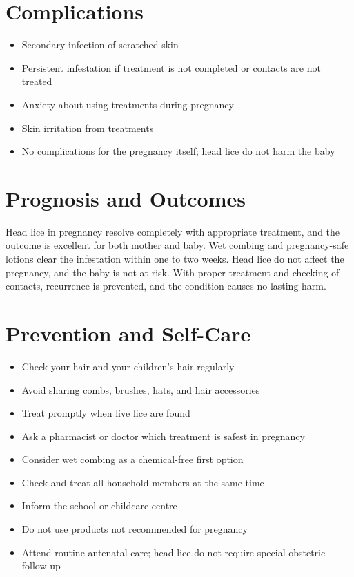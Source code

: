 \section*{Complications}
\begin{itemize}
    \item Secondary infection of scratched skin
    \item Persistent infestation if treatment is not completed or contacts are not treated
    \item Anxiety about using treatments during pregnancy
    \item Skin irritation from treatments
    \item No complications for the pregnancy itself; head lice do not harm the baby
\end{itemize}

\section*{Prognosis and Outcomes}
Head lice in pregnancy resolve completely with appropriate treatment, and the outcome is excellent for both mother and baby. Wet combing and pregnancy-safe lotions clear the infestation within one to two weeks. Head lice do not affect the pregnancy, and the baby is not at risk. With proper treatment and checking of contacts, recurrence is prevented, and the condition causes no lasting harm.

\section*{Prevention and Self-Care}
\begin{itemize}
    \item Check your hair and your children's hair regularly
    \item Avoid sharing combs, brushes, hats, and hair accessories
    \item Treat promptly when live lice are found
    \item Ask a pharmacist or doctor which treatment is safest in pregnancy
    \item Consider wet combing as a chemical-free first option
    \item Check and treat all household members at the same time
    \item Inform the school or childcare centre
    \item Do not use products not recommended for pregnancy
    \item Attend routine antenatal care; head lice do not require special obstetric follow-up
\end{itemize}

